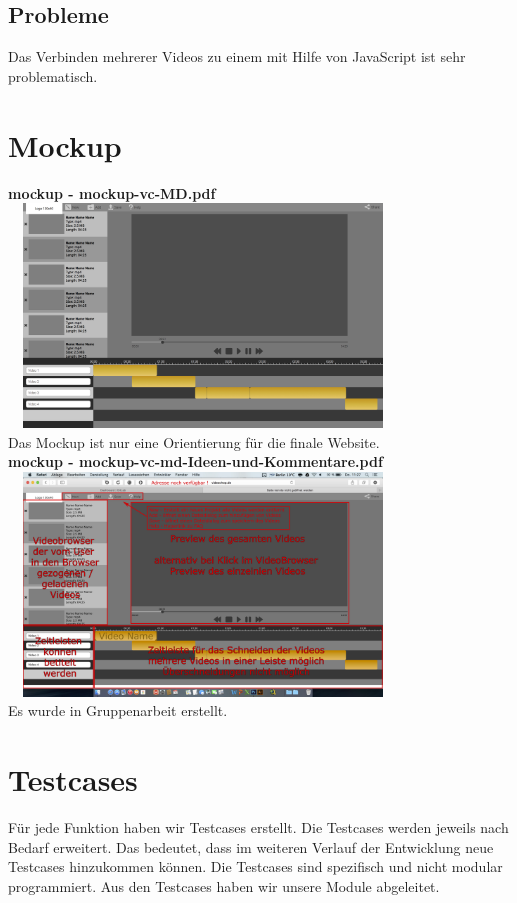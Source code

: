 \documentclass[a4paper,10pt]{scrartcl}
\begin{document}
\subsection{Probleme}
Das Verbinden mehrerer Videos zu einem mit Hilfe von JavaScript ist sehr problematisch.
\newpage
\section{Mockup}
\textbf{mockup - mockup-vc-MD.pdf} \\
\includegraphics[height=225px, width=390px]{images/mockup.png}\\
\vspace*{1mm}
Das Mockup ist nur eine Orientierung für die finale Website.\\ 
\textbf{mockup - mockup-vc-md-Ideen-und-Kommentare.pdf} \\
\includegraphics[height=225px, width=390px]{images/mockup2.png}\\
Es wurde in Gruppenarbeit erstellt.
\newpage
\section{Testcases}
Für jede Funktion haben wir Testcases erstellt. Die Testcases werden jeweils nach Bedarf erweitert. Das bedeutet, dass im weiteren Verlauf der Entwicklung neue Testcases hinzukommen können. Die Testcases sind spezifisch und nicht modular programmiert. Aus den Testcases haben wir unsere Module abgeleitet.
\end{document}
